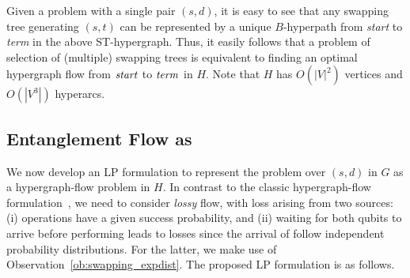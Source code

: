 Given a \qnr problem with a single pair $(s,d)$, it is easy to see
that any swapping tree generating $(s,t)$ \epss can be represented 
by a unique $B$-hyperpath from \emph{start} to \emph{term} in the above 
ST-hypergraph. Thus, it easily follows that 
a \qnr problem of selection of (multiple)
swapping trees is equivalent to finding an optimal hypergraph flow 
from $\mathit{start}$ to $\mathit{term}$ in $H$. Note that $H$ has $O(|V|^2)$
vertices and $O(|V^3|)$ hyperarcs.

\subsection{Entanglement Flow as \LP}

We now develop an LP formulation to represent the \qnr problem over $(s,d)$ in $G$
as a hypergraph-flow problem in $H$.
In contrast to the classic hypergraph-flow formulation~\cite{Beckenbach2019}, 
we need to consider \emph{lossy} flow, with loss arising
from two sources: (i) \es operations have a given success probability, and (ii) waiting for both qubits to arrive before performing \es leads to losses since the arrival of \epss follow independent probability distributions.
For the latter, we make use of Observation~\ref{ob:swapping_expdist}.
The proposed LP formulation is as follows.
